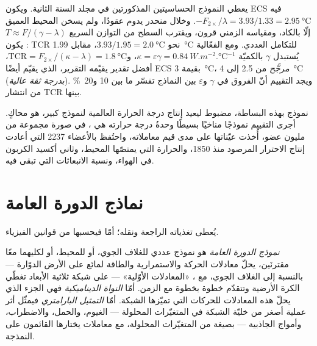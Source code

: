 يعطي النموذج الحساسيتين المذكورتين في مجلد السنة الثانية. ويكون ECS فيه
$-F_{2\times}/\lambda = 3.93/1.33 = \qty{2.95}{\celsius}$. وخلال منحدر
يدوم عقودًا، ولم يسخن المحيط العميق إلّا بالكاد، ومقياسه الزمني قرون،
ويقترب السطح من التوازن السريع $T \approx F/(\gamma -
\lambda)$: يكون TCR نحو $3.93/1.95 = \qty{2.0}{\celsius}$، مقابل
\qty{1.99}{\celsius} للتكامل العددي. ومع الفعّالية يُستبدل $\gamma$
بالكميّة $\kappa = \varepsilon\gamma = \qty{0.84}{W.m^{-2}.\celsius^{-1}}$،
و$\text{TCR} = F_{2\times}/(\kappa - \lambda) = \qty{1.8}{\celsius}$،
أفضل تقدير يقيّمه التقرير، الذي يقيّم أيضًا ECS بقيمة
\qty{3}{\celsius}، \emph{مرجَّح} من 2.5 إلى \qty{4}{\celsius} (\emph{بدرجة
ثقة عالية}). ويجد التقييم أنّ الفروق في $\gamma$ و$\varepsilon$ بين النماذج تفسّر
ما بين 10 و\qty{20}{\percent} من
انتشار TCR بينها.

نموذج بهذه البساطة، مضبوط ليعيد إنتاج درجة الحرارة العالمية لنموذج كبير،
هو محاكٍ. أجرى التقييم نموذجًا مناخيًا بسيطًا وحدةُ درجة حرارته هي
، في صورة مجموعة من مليون عضو، أُخذت عيّناتها على
مدى قيم معاملاته، واحتُفظ بالأعضاء 2237 التي أعادت إنتاج الاحترار المرصود
منذ 1850، والحرارة التي يمتصّها المحيط، وثاني أكسيد الكربون في الهواء،
ونسبة الانبعاثات التي تبقى فيه.

\section{نماذج الدورة العامة}\label{sec:b3:climate-models:gcm}

يُعطى  تغذياته الراجعة ونقله؛ أمّا
 فيحسبها من قوانين الفيزياء.

\begin{definition}\label{def:b3:climate-models:gcm}
\emph{نموذج الدورة العامة} 
هو نموذج عددي للغلاف الجوي، أو للمحيط، أو لكليهما معًا مقترنَين،
يحلّ معادلات الحركة والاستمرارية والطاقة لمائع على
الأرض الدوّارة --- بالنسبة إلى الغلاف الجوي، مع ،
«المعادلات الأوّلية» --- على شبكة ثلاثية الأبعاد
تغطّي الكرة الأرضية وتتقدّم خطوة بخطوة مع الزمن. أمّا \emph{النواة
الديناميكية} فهي الجزء الذي يحلّ هذه المعادلات للحركات
التي تميّزها الشبكة. أمّا
\emph{التمثيل البارامتري} فيمثّل أثر عملية
أصغر من خليّة الشبكة في المتغيّرات المحلولة --- الغيوم،
والحمل، والاضطراب، وأمواج الجاذبية --- بصيغة من المتغيّرات المحلولة،
مع معاملات يختارها القائمون على النمذجة.
\end{definition}

